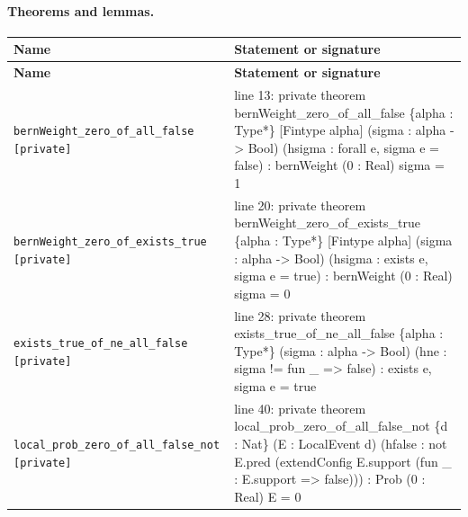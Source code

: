 \documentclass[10pt]{article}
\begin{document}
\paragraph{Theorems and lemmas.}
\begin{longtable}{>{\raggedright\arraybackslash}p{} >{\raggedright\arraybackslash}p{}}
\textbf{Name} & \textbf{Statement or signature} \\
\hline
\endfirsthead
\textbf{Name} & \textbf{Statement or signature} \\
\hline
\endhead
\texttt{bernWeight\_\allowbreak{}zero\_\allowbreak{}of\_\allowbreak{}all\_\allowbreak{}false [private]} & {\ttfamily\scriptsize line 13:\allowbreak{} private theorem bernWeight\_\allowbreak{}zero\_\allowbreak{}of\_\allowbreak{}all\_\allowbreak{}false \{alpha :\allowbreak{} Type*\allowbreak{}\} [Fintype alpha] (\allowbreak{}sigma :\allowbreak{} alpha -\allowbreak{}> Bool)\allowbreak{} (\allowbreak{}hsigma :\allowbreak{} forall e,\allowbreak{} sigma e =\allowbreak{} false)\allowbreak{} :\allowbreak{} bernWeight (\allowbreak{}0 :\allowbreak{} Real)\allowbreak{} sigma =\allowbreak{} 1} \\[0.45em]
\texttt{bernWeight\_\allowbreak{}zero\_\allowbreak{}of\_\allowbreak{}exists\_\allowbreak{}true [private]} & {\ttfamily\scriptsize line 20:\allowbreak{} private theorem bernWeight\_\allowbreak{}zero\_\allowbreak{}of\_\allowbreak{}exists\_\allowbreak{}true \{alpha :\allowbreak{} Type*\allowbreak{}\} [Fintype alpha] (\allowbreak{}sigma :\allowbreak{} alpha -\allowbreak{}> Bool)\allowbreak{} (\allowbreak{}hsigma :\allowbreak{} exists e,\allowbreak{} sigma e =\allowbreak{} true)\allowbreak{} :\allowbreak{} bernWeight (\allowbreak{}0 :\allowbreak{} Real)\allowbreak{} sigma =\allowbreak{} 0} \\[0.45em]
\texttt{exists\_\allowbreak{}true\_\allowbreak{}of\_\allowbreak{}ne\_\allowbreak{}all\_\allowbreak{}false [private]} & {\ttfamily\scriptsize line 28:\allowbreak{} private theorem exists\_\allowbreak{}true\_\allowbreak{}of\_\allowbreak{}ne\_\allowbreak{}all\_\allowbreak{}false \{alpha :\allowbreak{} Type*\allowbreak{}\} (\allowbreak{}sigma :\allowbreak{} alpha -\allowbreak{}> Bool)\allowbreak{} (\allowbreak{}hne :\allowbreak{} sigma !=\allowbreak{} fun \_\allowbreak{} =\allowbreak{}> false)\allowbreak{} :\allowbreak{} exists e,\allowbreak{} sigma e =\allowbreak{} true} \\[0.45em]
\texttt{local\_\allowbreak{}prob\_\allowbreak{}zero\_\allowbreak{}of\_\allowbreak{}all\_\allowbreak{}false\_\allowbreak{}not [private]} & {\ttfamily\scriptsize line 40:\allowbreak{} private theorem local\_\allowbreak{}prob\_\allowbreak{}zero\_\allowbreak{}of\_\allowbreak{}all\_\allowbreak{}false\_\allowbreak{}not \{d :\allowbreak{} Nat\} (\allowbreak{}E :\allowbreak{} LocalEvent d)\allowbreak{} (\allowbreak{}hfalse :\allowbreak{} not E.\allowbreak{}pred (\allowbreak{}extendConfig E.\allowbreak{}support (\allowbreak{}fun \_\allowbreak{} :\allowbreak{} E.\allowbreak{}support =\allowbreak{}> false)\allowbreak{})\allowbreak{})\allowbreak{} :\allowbreak{} Prob (\allowbreak{}0 :\allowbreak{} Real)\allowbreak{} E =\allowbreak{} 0} \\[0.45em]

\end{longtable}
\end{document}
